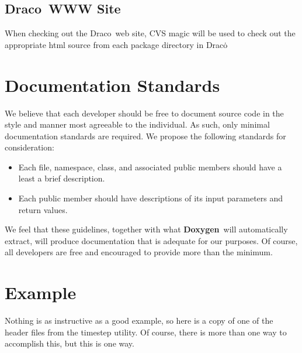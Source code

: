 \documentclass[11pt]{nmemo}
\newcommand{\draco}{{\normalfont\sffamily Draco}}
\newcommand{\doxy}{{\normalfont\bfseries Doxygen}}
\begin{document}
  \subsection{\draco\ WWW Site}
When checking out the \draco\ web site,
CVS magic will be used to check out the appropriate html source
from each package directory in \draco\.

\section{Documentation Standards}

We believe that each developer should be free to document source code
in the style and manner most agreeable to the individual. As such,
only minimal documentation standards are required.
We propose the following standards for consideration:

\begin{itemize}
\item Each file, namespace, class,  and associated public members should have 
a least a brief description.
\item Each public member should have descriptions of its input parameters and
return values.
\end{itemize}

We feel that these guidelines, together with what \doxy\ will automatically
extract, will produce documentation that is adequate for our purposes. Of
course, all developers are free and encouraged to provide more than the
minimum.

\section{Example}
Nothing is as instructive as a good example, so here is a copy of
one of the header files from the timestep utility. Of course,
there is more than one way to accomplish this, but this is one way.
\end{document}
